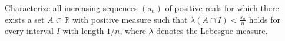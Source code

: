 Characterize all increasing sequences $(s_n)$ of positive reals for which there exists a set $A\subset \mathbb{R}$ with positive measure such that $\lambda(A\cap I)<\frac{s_n}{n}$ holds for every interval $I$ with length $1/n$, where $\lambda$ denotes the Lebesgue measure.